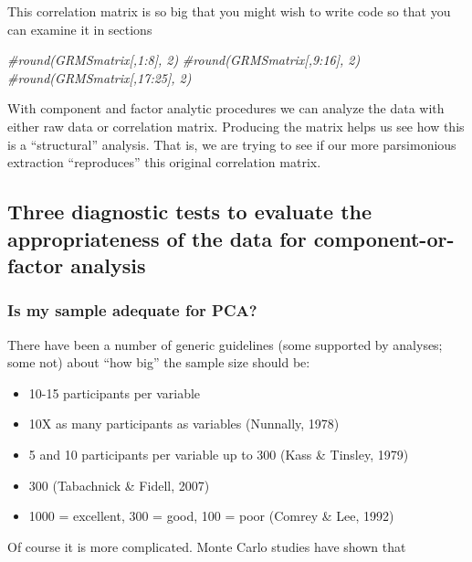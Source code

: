 \documentclass[
  english,
]{book}
\newenvironment{Shaded}{\begin{snugshade}}{\end{snugshade}}
\newcommand{\CommentTok}[1]{\textcolor[rgb]{0.56,0.35,0.01}{\textit{#1}}}
\providecommand{\tightlist}{%
  \setlength{\itemsep}{0pt}\setlength{\parskip}{0pt}}
\begin{document}
This correlation matrix is so big that you might wish to write code so that you can examine it in sections

\begin{Shaded}
\begin{Highlighting}[]
\CommentTok{#round(GRMSmatrix[,1:8], 2)}
\CommentTok{#round(GRMSmatrix[,9:16], 2)}
\CommentTok{#round(GRMSmatrix[,17:25], 2)}
\end{Highlighting}
\end{Shaded}

With component and factor analytic procedures we can analyze the data with either raw data or correlation matrix. Producing the matrix helps us see how this is a ``structural'' analysis. That is, we are trying to see if our more parsimonious extraction ``reproduces'' this original correlation matrix.

\hypertarget{three-diagnostic-tests-to-evaluate-the-appropriateness-of-the-data-for-component-or-factor-analysis}{%
\subsection{Three diagnostic tests to evaluate the appropriateness of the data for component-or-factor analysis}\label{three-diagnostic-tests-to-evaluate-the-appropriateness-of-the-data-for-component-or-factor-analysis}}

\hypertarget{is-my-sample-adequate-for-pca}{%
\subsubsection{Is my sample adequate for PCA?}\label{is-my-sample-adequate-for-pca}}

There have been a number of generic guidelines (some supported by analyses; some not) about ``how big'' the sample size should be:

\begin{itemize}
\tightlist
\item
  10-15 participants per variable
\item
  10X as many participants as variables (Nunnally, 1978)
\item
  5 and 10 participants per variable up to 300 (Kass \& Tinsley, 1979)
\item
  300 (Tabachnick \& Fidell, 2007)
\item
  1000 = excellent, 300 = good, 100 = poor (Comrey \& Lee, 1992)
\end{itemize}

Of course it is more complicated. Monte Carlo studies have shown that
\end{document}
